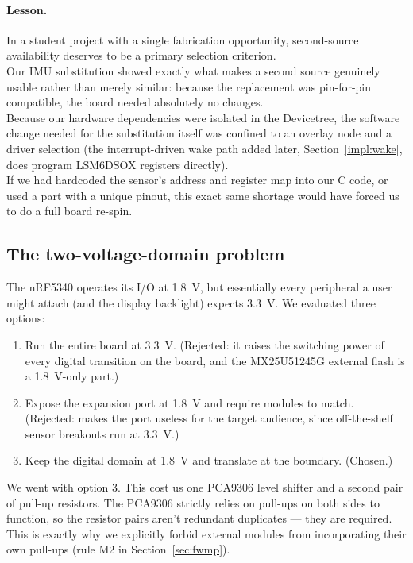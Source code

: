 \documentclass[12pt, a4paper]{article}
\begin{document}
\paragraph{Lesson.} In a student project with a single fabrication opportunity, second-source availability deserves to be a primary selection criterion. \\
Our IMU substitution showed exactly what makes a second source genuinely usable rather than merely similar: because the replacement was pin-for-pin compatible, the board needed absolutely no changes. \\
Because our hardware dependencies were isolated in the Devicetree, the software change needed for the substitution itself was confined to an overlay node and a driver selection (the interrupt-driven wake path added later, Section~\ref{impl:wake}, does program LSM6DSOX registers directly). \\
If we had hardcoded the sensor's address and register map into our C code, or used a part with a unique pinout, this exact same shortage would have forced us to do a full board re-spin.

\subsection{The two-voltage-domain problem}

The nRF5340 operates its I/O at \SI{1.8}{\volt}, but essentially every peripheral a user might attach (and the display backlight) expects \SI{3.3}{\volt}. We evaluated three options:

\begin{enumerate}
  \item Run the entire board at \SI{3.3}{\volt}. (Rejected: it raises the switching power of every digital transition on the board, and the MX25U51245G external flash is a \SI{1.8}{\volt}-only part.)
  \item Expose the expansion port at \SI{1.8}{\volt} and require modules to match. (Rejected: makes the port useless for the target audience, since off-the-shelf sensor breakouts run at \SI{3.3}{\volt}.)
  \item Keep the digital domain at \SI{1.8}{\volt} and translate at the boundary. (Chosen.)
\end{enumerate}

We went with option 3. This cost us one PCA9306 level shifter and a second pair of pull-up resistors. The PCA9306 strictly relies on pull-ups on both sides to function, so the resistor pairs aren't redundant duplicates --- they are required. This is exactly why we explicitly forbid external modules from incorporating their own pull-ups (rule M2 in Section~\ref{sec:fwmp}).
\end{document}
